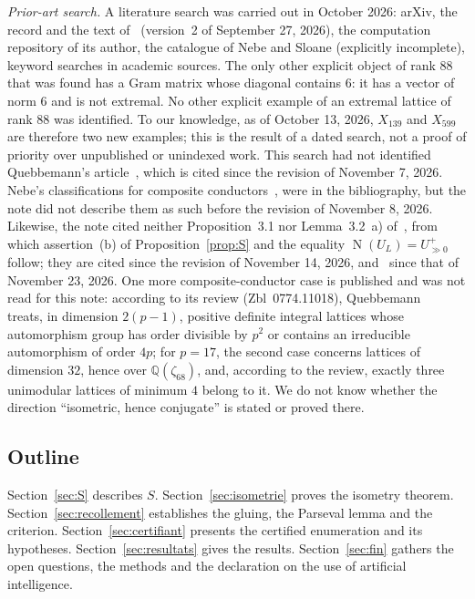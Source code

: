 \documentclass[11pt,a4paper]{amsart}
\theoremstyle{plain}
\theoremstyle{definition}
\numberwithin{equation}{section}
\newcommand{\Q}{\mathbb{Q}}
\DeclareMathOperator{\Nm}{N}
\newcommand{\Upp}{U^{+}_{\gg0}}
\begin{document}
\emph{Prior-art search.} A literature search was carried out in October 2026: arXiv, the record and the text of~\cite{Sak26} (version~2 of September 27, 2026), the computation repository of its author, the catalogue of Nebe and Sloane (explicitly incomplete), keyword searches in academic sources. The only other explicit object of rank $88$ that was found has a Gram matrix whose diagonal contains $6$: it has a vector of norm $6$ and is not extremal. No other explicit example of an extremal lattice of rank $88$ was identified. To our knowledge, as of October 13, 2026, $X_{139}$ and $X_{599}$ are therefore two new examples; this is the result of a dated search, not a proof of priority over unpublished or unindexed work. This search had not identified Quebbemann's article~\cite{Que81}, which is cited since the revision of November 7, 2026. Nebe's classifications for composite conductors~\cite[Thm.~5.3]{Neb13}, \cite[Thm.~4.5]{Neb16} were in the bibliography, but the note did not describe them as such before the revision of November 8, 2026. Likewise, the note cited neither Proposition~3.1 nor Lemma~3.2~a) of~\cite{Bay84}, from which assertion~(b) of Proposition~\ref{prop:S} and the equality $\Nm(U_L)=\Upp$ follow; they are cited since the revision of November 14, 2026, and~\cite{BFS05} since that of November 23, 2026. One more composite-conductor case is published and was not read for this note: according to its review (Zbl~0774.11018), Quebbemann~\cite{Que92} treats, in dimension $2(p-1)$, positive definite integral lattices whose automorphism group has order divisible by $p^2$ or contains an irreducible automorphism of order $4p$; for $p=17$, the second case concerns lattices of dimension $32$, hence over $\Q(\zeta_{68})$, and, according to the review, exactly three unimodular lattices of minimum $4$ belong to it. We do not know whether the direction ``isometric, hence conjugate'' is stated or proved there.

\subsection*{Outline}
Section~\ref{sec:S} describes $S$. Section~\ref{sec:isometrie} proves the isometry theorem. Section~\ref{sec:recollement} establishes the gluing, the Parseval lemma and the criterion. Section~\ref{sec:certifiant} presents the certified enumeration and its hypotheses. Section~\ref{sec:resultats} gives the results. Section~\ref{sec:fin} gathers the open questions, the methods and the declaration on the use of artificial intelligence.
\end{document}
